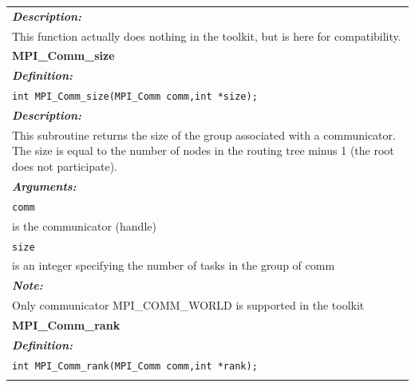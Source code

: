 \begin{longtable}{|p{5.5in}|}
\emph{\bfseries{Description: }} \\
This function actually does nothing in the toolkit, but is here for compatibility.\\

\hline

\vspace{-0.8cm}

\LARGE{\bfseries{MPI\_Comm\_size}} \\

\vspace{-0.3cm}

\emph{\bfseries{Definition: }} \\
\lstinline$int MPI_Comm_size(MPI_Comm comm,int *size);$ \\
\vspace{-0.3cm}

\emph{\bfseries{Description: }} \\
This subroutine returns the size of the group associated with a communicator. The size is equal to the number of nodes in the routing tree minus 1 (the root does not participate). \\
\vspace{-0.3cm}

\emph{\bfseries{Arguments: }} \\
\lstinline$comm$ \\
   \hspace{0.5cm}  is the communicator (handle) \\
\lstinline$size$ \\
\hspace{0.5cm}     is an integer specifying the number of tasks in the group of comm \\
\vspace{-0.3cm}

\emph{\bfseries{Note: }} \\
Only communicator MPI\_COMM\_WORLD is supported in the toolkit\\

\hline

\vspace{-0.8cm}

\LARGE{\bfseries{MPI\_Comm\_rank}} \\

\vspace{-0.3cm}

\emph{\bfseries{Definition: }} \\
\lstinline$int MPI_Comm_rank(MPI_Comm comm,int *rank);$ \\
\vspace{-0.3cm}


\end{longtable}
